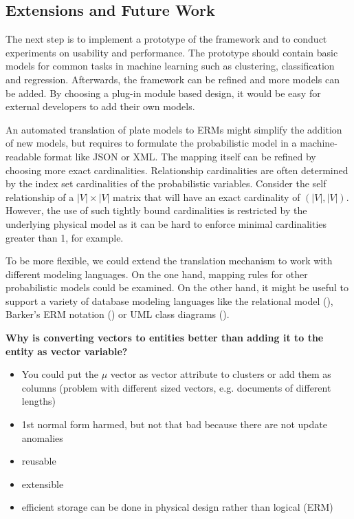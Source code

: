\subsection{Extensions and Future Work}

The next step is to implement a prototype of the framework and to conduct experiments on usability and performance. The prototype should contain basic models for common tasks in machine learning such as clustering, classification and regression. Afterwards, the framework can be refined and more models can be added. By choosing a plug-in module based design, it would be easy for external developers to add their own models.

An automated translation of plate models to ERMs might simplify the addition of new models, but requires to formulate the probabilistic model in a machine-readable format like JSON or XML. The mapping itself can be refined by choosing more exact cardinalities. Relationship cardinalities are often determined by the index set cardinalities of the probabilistic variables. Consider the self relationship of a $|V| \times |V|$ matrix that will have an exact cardinality of $(|V|, |V|)$. However, the use of such tightly bound cardinalities is restricted by the underlying physical model as it can be hard to enforce minimal cardinalities greater than 1, for example.

To be more flexible, we could extend the translation mechanism to work with different modeling languages. On the one hand, mapping rules for other probabilistic models could be examined. On the other hand, it might be useful to support a variety of database modeling languages like the relational model (\cite{codd1970relational}), Barker's ERM notation (\cite{barker1990case}) or UML class diagrams (\cite{rumbaugh2004unified}).

\textbf{Why is converting vectors to entities better than adding it to the entity as vector variable?}
\begin{itemize}
\item You could put the $\mu$ vector as vector attribute to clusters or add them as columns (problem with different sized vectors, e.g. documents of different lengths)
\item 1st normal form harmed, but not that bad because there are not update anomalies
\item reusable
\item extensible
\item efficient storage can be done in physical design rather than logical (ERM)
\end{itemize}

